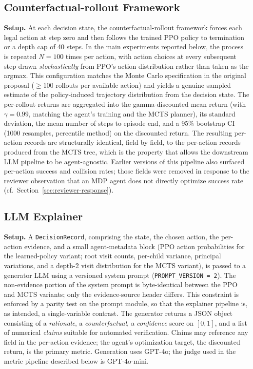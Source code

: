 \documentclass[conference]{IEEEtran}
\begin{document}
\subsection{Counterfactual-rollout Framework}
\textbf{Setup.} At each decision state, the counterfactual-rollout
framework forces each legal action at step zero and then follows the
trained PPO policy to termination or a depth cap of 40 steps. In the
main experiments reported below, the process is repeated $N=100$
times per action, with action choices at every subsequent step drawn
\emph{stochastically} from PPO's action distribution rather than
taken as the argmax. This configuration matches the Monte Carlo
specification in the original proposal ($\geq 100$ rollouts per
available action) and yields a genuine sampled estimate of the
policy-induced trajectory distribution from the decision state. The
per-rollout returns are aggregated into the gamma-discounted mean
return (with $\gamma = 0.99$, matching the agent's training and the
MCTS planner), its standard deviation, the mean number of steps to
episode end, and a 95\% bootstrap CI (1000 resamples, percentile
method) on the discounted return. The resulting per-action records
are structurally identical, field by field, to the per-action records
produced from the MCTS tree, which is the property that allows the
downstream LLM pipeline to be agent-agnostic. Earlier versions of
this pipeline also surfaced per-action success and collision rates;
those fields were removed in response to the reviewer observation
that an MDP agent does not directly optimize success rate
(cf.~Section~\ref{sec:reviewer-response}).

\subsection{LLM Explainer}
\textbf{Setup.} A \texttt{DecisionRecord}, comprising the state, the
chosen action, the per-action evidence, and a small agent-metadata
block (PPO action probabilities for the learned-policy variant; root
visit counts, per-child variance, principal variations, and a
depth-2 visit distribution for the MCTS variant), is passed to a
generator LLM using a versioned system prompt
(\texttt{PROMPT\_VERSION = 2}). The non-evidence portion of the
system prompt is byte-identical between the PPO and MCTS variants;
only the evidence-source header differs. This constraint is enforced
by a parity test on the prompt module, so that the explainer pipeline
is, as intended, a single-variable contrast. The generator returns a
JSON object consisting of a \emph{rationale}, a \emph{counterfactual},
a \emph{confidence} score on $[0, 1]$, and a list of numerical
\emph{claims} suitable for automated verification. Claims may
reference any field in the per-action evidence; the agent's
optimization target, the discounted return, is the primary metric.
Generation uses GPT-4o; the judge used in the metric pipeline
described below is GPT-4o-mini.
\end{document}
